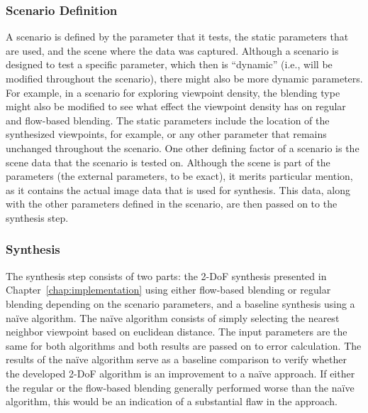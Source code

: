 \subsubsection{Scenario Definition}
A scenario is defined by the parameter that it tests, the static parameters that are used, and the scene where the data was captured. Although a scenario is designed to test a specific parameter, which then is ``dynamic'' (i.e., will be modified throughout the scenario), there might also be more dynamic parameters. For example, in a scenario for exploring viewpoint density, the blending type might also be modified to see what effect the viewpoint density has on regular and flow-based blending. The static parameters include the location of the synthesized viewpoints, for example, or any other parameter that remains unchanged throughout the scenario. One other defining factor of a scenario is the scene data that the scenario is tested on. Although the scene is part of the parameters (the external parameters, to be exact), it merits particular mention, as it contains the actual image data that is used for synthesis. This data, along with the other parameters defined in the scenario, are then passed on to the synthesis step.



\subsubsection{Synthesis}
The synthesis step consists of two parts: the 2-DoF synthesis presented in Chapter~\ref{chap:implementation} using either flow-based blending or regular blending depending on the scenario parameters, and a baseline synthesis using a na\"ive algorithm.
The na\"ive algorithm consists of simply selecting the nearest neighbor viewpoint based on euclidean distance. The input parameters are the same for both algorithms and both results are passed on to error calculation.
The results of the na\"ive algorithm serve as a baseline comparison to verify whether the developed 2-DoF algorithm is an improvement to a na\"ive approach. If either the regular or the flow-based blending generally performed worse than the na\"ive algorithm, this would be an indication of a substantial flaw in the approach.

